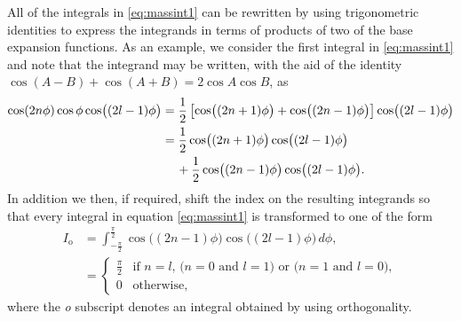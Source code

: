 All of the integrals in \eqref{eq:massint1} can be rewritten by using trigonometric identities to express the integrands in terms of products of two of the base expansion functions. As an example, we consider the first integral in \eqref{eq:massint1} and note that the integrand may be written, with the aid of the identity $\cos(A-B)+\cos(A+B)=2\cos A\cos B$, as
\begin{align}
\cos(2n\phi)\cos\phi\cos\bigl((2l-1)\phi\bigr)&=\frac{1}{2}\left[\cos\bigl((2n+1)\phi\bigr)+\cos\bigl((2n-1)\phi\bigr)\right]\cos\bigl((2l-1)\phi\bigr) \notag\\
&=\frac{1}{2}\cos\bigl((2n+1)\phi\bigr)\cos\bigl((2l-1)\phi\bigr) \notag \\
&{} \quad\, +\frac{1}{2}\cos\bigl((2n-1)\phi\bigr)\cos\bigl((2l-1)\phi\bigr). \label{eq:trigident}
\end{align}
In addition we then, if required, shift the index on the resulting integrands so that every integral in equation \eqref{eq:massint1} is transformed to one of the form
\begin{align}
I_{\text{o}}&=\int_{-\frac{\pi}{2}}^{\frac{\pi}{2}} \cos\bigl((2n-1)\phi\bigr) \cos\bigl((2l-1)\phi\bigr)\,d\phi, \label{eq:orthocond} \\
&=\begin{cases}
\frac{\displaystyle \pi}{2}& \text{if $n=l$, ($n=0$ and $l=1$) or ($n=1$ and $l=0$}),\\[2mm]
0& \text{otherwise},
\end{cases} \label{eq:orthog}
\end{align}where the {\itshape o} subscript denotes an integral obtained by using orthogonality. 

